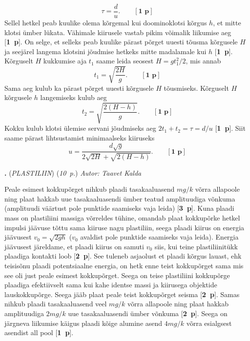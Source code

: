\documentclass[11pt,a5paper]{article}
\newcommand{\numb}[1]{\vspace{5pt}\textbf{\large #1}}
\newcommand{\nimi}[1]{(\textsl{\small #1})}
\newcommand{\punktid}[1]{(\emph{#1~p.})}
\newcommand{\p}[1]{[\textbf{#1~p}]}
\newcounter{ylesanne}
\newcommand{\yl}[1]{\addtocounter{ylesanne}{1}\numb{\theylesanne.} \nimi{#1} \newblock{}}
\newcommand{\autor}[1]{\emph{Autor: #1}}%
\begin{document}
\begin{equation*}
\tau=\frac{d}{u}. \qquad \p1
\end{equation*}
Sellel hetkel peab kuulike olema kõrgemal kui doominoklotsi kõrgus $h$, et mitte klotsi ümber lükata. Vähimale kiirusele vastab pikim võimalik liikumise aeg \p1. On selge, et selleks peab kuulike pärast põrget uuesti tõusma kõrgusele $H$ ja seejärel langema klotsini jõudmise hetkeks mitte madalamale kui $h$ \p1. Kõrguselt $H$ kukkumise aja $t_1$ saame leida seosest $H=gt_1^2/2$, mis annab
\begin{equation*}
t_1=\sqrt{\frac{2H}{g}}. \qquad \p1
\end{equation*}
Sama aeg kulub ka pärast põrget uuesti kõrgusele $H$ tõusmiseks. Kõrguselt $H$ kõrgusele $h$ langemiseks kulub aeg
\begin{equation*}
t_2=\sqrt{\frac{2(H-h)}{g}}. \qquad \p1
\end{equation*}
Kokku kulub klotsi ülemise servani jõudmiseks aeg $2t_1+t_2=\tau=d/u$ \p1. Siit saame pärast lihtsustamist minimaalseks kiiruseks
\begin{equation*}
  u=\frac{d\sqrt{g}}{2\sqrt{2H}+\sqrt{2(H-h)}}. \qquad \p1
\end{equation*}

\newpage
\yl{PLASTILIIN}
\punktid{10} \autor{Taavet Kalda}

Peale esimest kokkupõrget nihkub plaadi tasakaaluasend $mg/k$ võrra allapoole ning plaat hakkab uue tasakaaluasendi ümber teatud amplituudiga võnkuma (amplituudi väärtust pole punktide saamiseks vaja leida) \p3. Kuna plaadi mass on plastiliini massiga võrreldes tühine, omandab plaat kokkupõrke hetkel impulsi jäävuse tõttu sama kiiruse nagu plastiliin, seega plaadi kiirus on energia jäävusest $v_0 = \sqrt{2gh}$ ($v_0$ avaldist pole punktide saamiseks vaja leida). Energia jäävusest järeldame, et plaadi kiirus on samuti $v_0$ siis, kui teine plastiliinitükk plaadiga kontakti loob \p2. See tuleneb asjaolust et plaadi kõrgus lauast, ehk teisisõnu plaadi potentsiaalne energia, on hetk enne teist kokkupõrget sama mis see oli just peale esimest kokkupõrget. Seega on teise plastiliini kokkupõrge plaadiga efektiivselt sama kui kahe identse massi ja kiirusega objektide lauskokkupõrge. Seega jääb plaat peale teist kokkupõrget seisma \p2. Samas nihkub plaadi tasakaaluasend veel $mg/k$ võrra allapoole ning plaat hakkab amplituudiga $2mg/k$ uue tasakaaluasendi ümber võnkuma \p2. Seega on järgneva liikumise käigus plaadi kõige alumine asend $4mg/k$ võrra esialgsest asendist all pool \p1.
\end{document}
